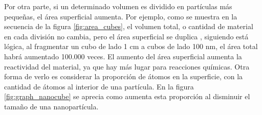Por otra parte, si un determinado volumen es dividido en partículas más pequeñas, el área superficial aumenta. Por ejemplo, como se muestra en la secuencia de la figura \ref{fig:area_cubes}, el volumen total, o cantidad de material en cada división no cambia, pero el área superficial se duplica \footnotemark, siguiendo está lógica, al fragmentar un cubo de lado 1 cm a cubos de lado 100 nm, el área total habrá aumentado 100.000 veces. El aumento del área superficial aumenta la reactividad del material, ya que hay más lugar para reacciones químicas. Otra forma de verlo es considerar la proporción de átomos en la superficie, con la cantidad de átomos al interior de una partícula. En la figura \ref{fig:graph_nanocube} se aprecia como aumenta esta proporción al disminuir el tamaño de una nanopartícula.


